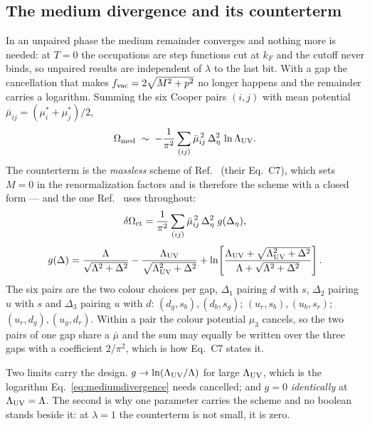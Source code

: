 \documentclass[aps,prc,onecolumn,superscriptaddress,nofootinbib,10pt]{revtex4-2}
\newcommand{\Lam}{\Lambda}
\begin{document}
\subsection{The medium divergence and its counterterm}

In an unpaired phase the medium remainder converges and nothing more is needed:
at $T = 0$ the occupations are step functions cut at $k_F$ and the cutoff never
binds, so unpaired results are independent of $\lambda$ to the last bit. With a
gap the cancellation that makes $f_{\rm vac} = 2\sqrt{M^2 + p^2}$ no longer
happens and the remainder carries a logarithm. Summing the six Cooper pairs
$(i,j)$ with mean potential $\bar\mu_{ij} = (\mu^{*}_i + \mu^{*}_j)/2$,
%
\begin{equation}
  \Omega_{\rm med} \;\sim\;
  -\frac{1}{\pi^2}\sum_{(ij)} \bar\mu_{ij}^{\,2}\,\Delta_\eta^2
   \,\ln \Lam_{\rm UV} .
  \label{eq:mediumdivergence}
\end{equation}
%
The counterterm is the \emph{massless} scheme of Ref.~\cite{Gholami2024}
(their Eq.~C7), which sets $M = 0$ in the renormalization factors and is
therefore the scheme with a closed form --- and the one Ref.~\cite{Kunkel2026}
uses throughout:
%
\begin{equation}
  \delta\Omega_{\rm ct} = \frac{1}{\pi^2}
  \sum_{(ij)} \bar\mu_{ij}^{\,2}\,\Delta_\eta^2\; g(\Delta_\eta) ,
  \label{eq:counterterm}
\end{equation}
\begin{equation}
  g(\Delta) = \frac{\Lam}{\sqrt{\Lam^2 + \Delta^2}}
            - \frac{\Lam_{\rm UV}}{\sqrt{\Lam_{\rm UV}^2 + \Delta^2}}
            + \ln\!\left[
              \frac{\Lam_{\rm UV} + \sqrt{\Lam_{\rm UV}^2 + \Delta^2}}
                   {\Lam + \sqrt{\Lam^2 + \Delta^2}} \right] .
  \label{eq:countertermshape}
\end{equation}
%
The six pairs are the two colour choices per gap, $\Delta_1$ pairing $d$ with
$s$, $\Delta_2$ pairing $u$ with $s$ and $\Delta_3$ pairing $u$ with $d$:
$(d_g, s_b), (d_b, s_g)$; $(u_r, s_b), (u_b, s_r)$; $(u_r, d_g), (u_g, d_r)$.
Within a pair the colour potential $\mu_3$ cancels, so the two pairs of one gap
share a $\bar\mu$ and the sum may equally be written over the three gaps with a
coefficient $2/\pi^2$, which is how Eq.~C7 states it.

Two limits carry the design. $g \to \ln(\Lam_{\rm UV}/\Lam)$ for large
$\Lam_{\rm UV}$, which is the logarithm Eq.~\eqref{eq:mediumdivergence} needs
cancelled; and $g = 0$ \emph{identically} at $\Lam_{\rm UV} = \Lam$. The second
is why one parameter carries the scheme and no boolean stands beside it: at
$\lambda = 1$ the counterterm is not small, it is zero.
\end{document}
